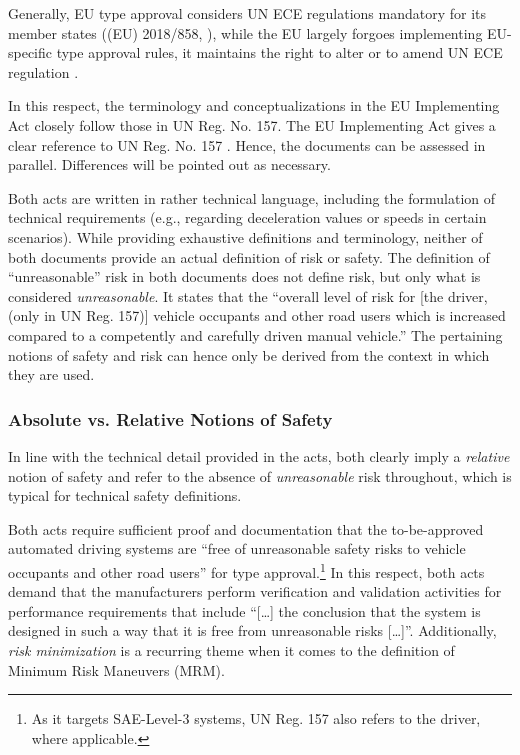 Generally, EU type approval considers UN ECE regulations mandatory for its member states ((EU) 2018/858, \parencite{eu858}), while the EU largely forgoes implementing EU-specific type approval rules, it maintains the right to alter or to amend UN ECE regulation \parencite{eu858}.

In this respect, the terminology and conceptualizations in the EU Implementing Act closely follow those in UN Reg. No. 157.
The EU Implementing Act gives a clear reference to UN Reg. No. 157 \parencite[][Preamble,  Paragraph 1]{eu1426}.
Hence, the documents can be assessed in parallel.
Differences will be pointed out as necessary.

Both acts are written in rather technical language, including the formulation of technical requirements (e.g., regarding deceleration values or speeds in certain scenarios).
While providing exhaustive definitions and terminology, neither of both documents provide an actual definition of risk or safety.
The definition of ``unreasonable'' risk in both documents does not define risk, but only what is considered \emph{unreasonable}. It states that the ``overall level of risk for [the driver, (only in UN Reg. 157)] vehicle occupants and other road users which is increased compared to a competently and carefully driven manual vehicle.''
The pertaining notions of safety and risk can hence only be derived from the context in which they are used.

\subsubsection{Absolute vs. Relative Notions of Safety}
In line with the technical detail provided in the acts, both clearly imply a \emph{relative} notion of safety and refer to the absence of \emph{unreasonable} risk throughout, which is typical for technical safety definitions.

Both acts require sufficient proof and documentation that the to-be-approved automated driving systems are ``free of unreasonable safety risks to vehicle occupants and other road users'' for type approval.\footnote{As it targets SAE-Level-3 systems, UN Reg. 157 also refers to the driver, where applicable.}
In this respect, both acts demand that the manufacturers perform verification and validation activities for performance requirements that include ``[\ldots] the conclusion that the system is designed in such a way that it is free from unreasonable risks [\ldots]''.
Additionally, \emph{risk minimization} is a recurring theme when it comes to the definition of Minimum Risk Maneuvers (MRM).

